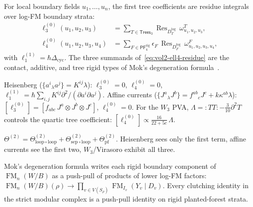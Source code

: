 \begin{construction}
\label{const:vol2-pva-coordinate-graph-coefficients}
For local boundary fields $u_1,\dots,u_n$, the first tree
coefficients are residue integrals over log-FM boundary strata:
\begin{align}
\ell_3^{(0)}(u_1,u_2,u_3)
&=
\sum_{T\in \mathsf{Trees}_3}
\operatorname{Res}_{D_T^{\log}}\,\omega^{T}_{u_1,u_2,u_3},
\label{eq:vol2-ell3-residue}\\
\ell_4^{(0)}(u_1,u_2,u_3,u_4)
&=
\sum_{F\in \mathsf{PF}^{\mathrm{rig}}_4}
\epsilon_F\,\operatorname{Res}_{D_F^{\log}}\,\omega^{F}_{u_1,u_2,u_3,u_4},
\label{eq:vol2-ell4-residue}
\end{align}
with $\ell_1^{(1)}=\hbar\Delta_{\mathrm{cyc}}$.
The three summands of~\eqref{eq:vol2-ell4-residue} are the
contact, additive, and tree rigid types of Mok's degeneration
formula~\cite[Corollary~5.3.4]{Mok25}.
\end{construction}

\begin{computation}
\label{comp:vol2-archetype-formulas}
Heisenberg ($\{a^i{}_{\lambda}a^j\}=K^{ij}\lambda$):
$\ell_3^{(0)}=0$, $\ell_4^{(0)}=0$,
$\ell_1^{(1)}=\hbar\sum_{i,j}K^{ij}\partial^2/(\partial a^i\partial a^j)$.
Affine currents ($\{J^a{}_{\lambda}J^b\}=f^{ab}{}_cJ^c+k\kappa^{ab}\lambda$):
$[\ell_3^{(0)}]=[f_{abc}\,J^a\otimes J^b\otimes J^c]$,
$\ell_4^{(0)}=0$.
For the $W_3$ PVA, $\Lambda={:}TT{:}-\tfrac{3}{10}\partial^2T$
controls the quartic tree coefficient: $[\ell_4^{(0)}]\propto
\tfrac{16}{22+5c}\,\Lambda$.
\end{computation}

\begin{remark}
\label{rem:vol2-genus-two-entry}
$\Theta^{(2)}
=
\Theta^{(2)}_{\mathrm{loop}\circ\mathrm{loop}}
+\Theta^{(2)}_{\mathrm{sep}\circ\mathrm{loop}}
+\Theta^{(2)}_{\mathrm{pf}}$.
Heisenberg sees only the first term, affine currents see the first two,
$W_3$/Virasoro exhibit all three.
\end{remark}

\begin{remark}
\label{rem:vol2-rigid-type-boundary-factorization}
Mok's degeneration formula writes each rigid boundary component of
$\operatorname{FM}_n(W/B)$ as a push-pull of products of lower log-FM factors:
$\operatorname{FM}_n(W/B)(\rho)\to
\prod_{v\in V(S_\rho)}\operatorname{FM}_{I_v}(Y_v\mathbin{|}D_v)$.
Every clutching identity in the strict modular complex is a
push-pull identity on rigid planted-forest strata.
\end{remark}

